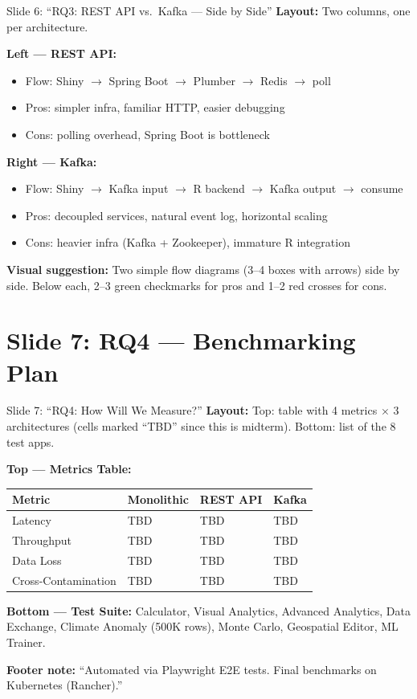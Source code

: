 \documentclass[12pt,a4paper]{article}
\begin{document}
\begin{slidebox}{Slide 6: ``RQ3: REST API vs.\ Kafka --- Side by Side''}
\textbf{Layout:} Two columns, one per architecture.

\textbf{Left --- REST API:}
\begin{itemize}[nosep]
  \item Flow: Shiny $\rightarrow$ Spring Boot $\rightarrow$ Plumber $\rightarrow$ Redis $\rightarrow$ poll
  \item Pros: simpler infra, familiar HTTP, easier debugging
  \item Cons: polling overhead, Spring Boot is bottleneck
\end{itemize}

\textbf{Right --- Kafka:}
\begin{itemize}[nosep]
  \item Flow: Shiny $\rightarrow$ Kafka input $\rightarrow$ R backend $\rightarrow$ Kafka output $\rightarrow$ consume
  \item Pros: decoupled services, natural event log, horizontal scaling
  \item Cons: heavier infra (Kafka + Zookeeper), immature R integration
\end{itemize}

\textbf{Visual suggestion:} Two simple flow diagrams (3--4 boxes with arrows) side by side. Below each, 2--3 green checkmarks for pros and 1--2 red crosses for cons.
\end{slidebox}

\section{Slide 7: RQ4 --- Benchmarking Plan}

\begin{slidebox}{Slide 7: ``RQ4: How Will We Measure?''}
\textbf{Layout:} Top: table with 4 metrics $\times$ 3 architectures (cells marked ``TBD'' since this is midterm). Bottom: list of the 8 test apps.

\textbf{Top --- Metrics Table:}

\begin{tabular}{@{}llll@{}}
\toprule
Metric & Monolithic & REST API & Kafka \\
\midrule
Latency & TBD & TBD & TBD \\
Throughput & TBD & TBD & TBD \\
Data Loss & TBD & TBD & TBD \\
Cross-Contamination & TBD & TBD & TBD \\
\bottomrule
\end{tabular}

\textbf{Bottom --- Test Suite:}
Calculator, Visual Analytics, Advanced Analytics, Data Exchange, Climate Anomaly (500K rows), Monte Carlo, Geospatial Editor, ML Trainer.

\textbf{Footer note:} ``Automated via Playwright E2E tests. Final benchmarks on Kubernetes (Rancher).''
\end{slidebox}
\end{document}
